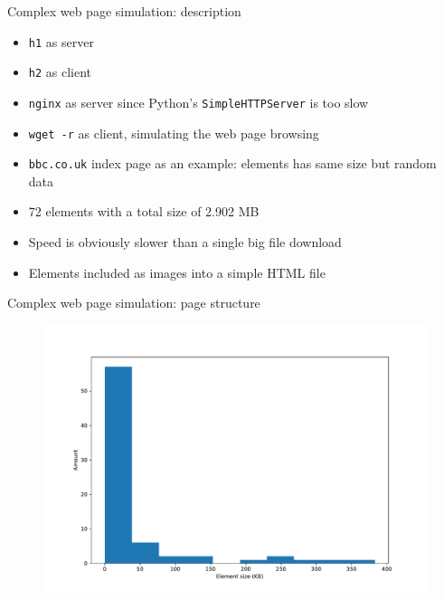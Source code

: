\documentclass[13pt,aspectratio=43]{beamer}
\begin{document}
\begin{frame}{Complex web page simulation: description}
	\begin{itemize}
		\item \texttt{h1} as server
		\item \texttt{h2} as client
		\item \texttt{nginx} as server since Python's \texttt{SimpleHTTPServer} is too slow
		\item \texttt{wget -r} as client, simulating the web page browsing
		\item \texttt{bbc.co.uk} index page as an example: elements has same size but random data
		\item 72 elements with a total size of 2.902 MB
		\item Speed is obviously slower than a single big file download
		\item Elements included as images into a simple HTML file
	\end{itemize}
\end{frame}

\begin{frame}{Complex web page simulation: page structure}
  \begin{figure}
	  \includegraphics[width=\textwidth,height=\textheight,keepaspectratio]{../http_test/page_stat.pdf}
  \end{figure}

\end{frame}
\end{document}
